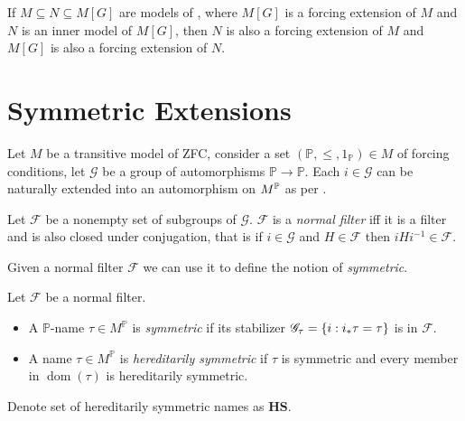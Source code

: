 \begin{theorem}
    \label{proposition:intermediate_model_property}
    If \(M\subseteq N\subseteq M[G]\) are models of \ZFC,
    where \(M[G]\) is a forcing extension of \(M\) and \(N\) is an inner model of \(M[G]\),
    then \(N\) is also a forcing extension of \(M\) and
    \(M[G]\) is also a forcing extension of \(N\).
\end{theorem}


\section{Symmetric Extensions}


\renewcommand*{\G}{\mathscr{G}}
\newcommand*{\dom}{\operatorname{dom}}
\newcommand*{\val}{\operatorname{val}}
Let \(M\) be a transitive model of ZFC, consider a set \((\mathbb{P}, \leq, 1_{\mathbb{P}}) \in M\) of forcing conditions,
let \(\G\) be a group of automorphisms \(\mathbb{P} \to \mathbb{P}\).
Each \(i\in \G\) can be naturally extended into an automorphism on \(M^\P\) as per .

\begin{definition}
    Let \(\mathscr{F}\) be a nonempty set of subgroups of \(\G\).
    \(\mathscr{F}\) is a \emph{normal filter} iff it is a filter and is also closed under conjugation, that is
    if \(i\in \G\) and \(H\in\mathscr{F}\) then \(i H i^{-1} \in\mathscr{F}\).
\end{definition}
Given a normal filter \(\mathscr{F}\) we can use it to define the notion of \emph{symmetric}.
\begin{definition}
    Let \(\mathscr{F}\) be a normal filter.
    \begin{itemize}
        \item A \(\mathbb{P}\)-name \(\tau\in M^{\mathbb{P}}\) is \emph{symmetric} if its stabilizer \(\G_\tau = \set{i: i_* \tau = \tau}\) is in \(\mathscr{F}\).
        \item A name \(\tau\in M^{\mathbb{P}}\) is \emph{hereditarily symmetric} if \(\tau\) is symmetric and every member in \(\dom(\tau)\) is hereditarily symmetric.
    \end{itemize}
    Denote set of hereditarily symmetric names as \(\mathbf{HS}\).
\end{definition}

